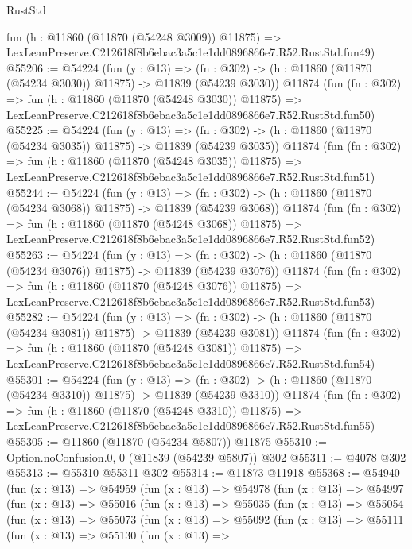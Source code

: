 \begin{lexlean}{RustStd}
\begin{coremodule}
    fun (h : @11860 (@11870 (@54248 @3009)) @11875) =>
    LexLeanPreserve.C212618f8b6ebac3a5c1e1dd0896866e7.R52.RustStd.fun49)
@55206 := @54224
    (fun (y : @13) =>
    (fn : @302) -> (h : @11860 (@11870 (@54234 @3030)) @11875) -> @11839 (@54239 @3030))
    @11874
    (fun (fn : @302) =>
    fun (h : @11860 (@11870 (@54248 @3030)) @11875) =>
    LexLeanPreserve.C212618f8b6ebac3a5c1e1dd0896866e7.R52.RustStd.fun50)
@55225 := @54224
    (fun (y : @13) =>
    (fn : @302) -> (h : @11860 (@11870 (@54234 @3035)) @11875) -> @11839 (@54239 @3035))
    @11874
    (fun (fn : @302) =>
    fun (h : @11860 (@11870 (@54248 @3035)) @11875) =>
    LexLeanPreserve.C212618f8b6ebac3a5c1e1dd0896866e7.R52.RustStd.fun51)
@55244 := @54224
    (fun (y : @13) =>
    (fn : @302) -> (h : @11860 (@11870 (@54234 @3068)) @11875) -> @11839 (@54239 @3068))
    @11874
    (fun (fn : @302) =>
    fun (h : @11860 (@11870 (@54248 @3068)) @11875) =>
    LexLeanPreserve.C212618f8b6ebac3a5c1e1dd0896866e7.R52.RustStd.fun52)
@55263 := @54224
    (fun (y : @13) =>
    (fn : @302) -> (h : @11860 (@11870 (@54234 @3076)) @11875) -> @11839 (@54239 @3076))
    @11874
    (fun (fn : @302) =>
    fun (h : @11860 (@11870 (@54248 @3076)) @11875) =>
    LexLeanPreserve.C212618f8b6ebac3a5c1e1dd0896866e7.R52.RustStd.fun53)
@55282 := @54224
    (fun (y : @13) =>
    (fn : @302) -> (h : @11860 (@11870 (@54234 @3081)) @11875) -> @11839 (@54239 @3081))
    @11874
    (fun (fn : @302) =>
    fun (h : @11860 (@11870 (@54248 @3081)) @11875) =>
    LexLeanPreserve.C212618f8b6ebac3a5c1e1dd0896866e7.R52.RustStd.fun54)
@55301 := @54224
    (fun (y : @13) =>
    (fn : @302) -> (h : @11860 (@11870 (@54234 @3310)) @11875) -> @11839 (@54239 @3310))
    @11874
    (fun (fn : @302) =>
    fun (h : @11860 (@11870 (@54248 @3310)) @11875) =>
    LexLeanPreserve.C212618f8b6ebac3a5c1e1dd0896866e7.R52.RustStd.fun55)
@55305 := @11860 (@11870 (@54234 @5807)) @11875
@55310 := Option.noConfusion.{0, 0} (@11839 (@54239 @5807)) @302
@55311 := @4078 @302
@55313 := @55310 @55311 @302
@55314 := @11873 @11918
@55368 := @54940
    (fun (x : @13) =>
    @54959
      (fun (x : @13) =>
      @54978
        (fun (x : @13) =>
        @54997
          (fun (x : @13) =>
          @55016
            (fun (x : @13) =>
            @55035
              (fun (x : @13) =>
              @55054
                (fun (x : @13) =>
                @55073
                  (fun (x : @13) =>
                  @55092
                    (fun (x : @13) =>
                    @55111
                      (fun (x : @13) =>
                      @55130
                        (fun (x : @13) =>

\end{coremodule}
\end{lexlean}
